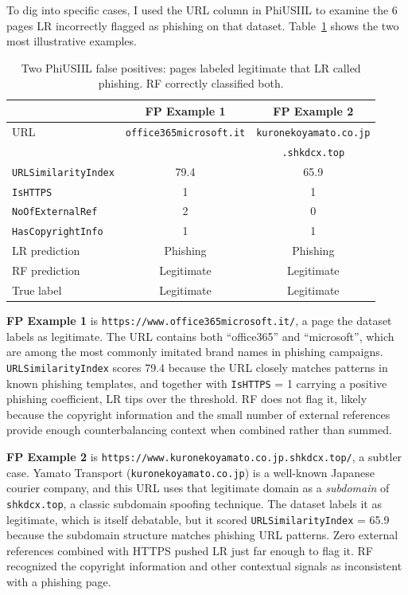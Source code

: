 \documentclass{article}
\begin{document}
To dig into specific cases, I used the URL column in PhiUSIIL to examine the 6 pages LR incorrectly flagged as phishing on that dataset.
Table~\ref{tab:fp_examples} shows the two most illustrative examples.

\begin{table}[ht]
\caption{Two PhiUSIIL false positives: pages labeled legitimate that LR called phishing. RF correctly classified both.}
\label{tab:fp_examples}
\centering
\small
\begin{tabular}{lcc}
\toprule
 & FP Example 1 & FP Example 2 \\
\midrule
URL & \texttt{office365microsoft.it} & \texttt{kuronekoyamato.co.jp} \\
    & & \texttt{.shkdcx.top} \\
\texttt{URLSimilarityIndex}    & 79.4 & 65.9 \\
\texttt{IsHTTPS}               & 1    & 1    \\
\texttt{NoOfExternalRef}       & 2    & 0    \\
\texttt{HasCopyrightInfo}      & 1    & 1    \\
\midrule
LR prediction  & Phishing   & Phishing   \\
RF prediction  & Legitimate & Legitimate \\
True label     & Legitimate & Legitimate \\
\bottomrule
\end{tabular}
\end{table}

\textbf{FP Example 1} is \texttt{https://www.office365microsoft.it/}, a page the dataset labels as legitimate.
The URL contains both ``office365'' and ``microsoft'', which are among the most commonly imitated brand names in phishing campaigns.
\texttt{URLSimilarityIndex} scores 79.4 because the URL closely matches patterns in known phishing templates, and together with \texttt{IsHTTPS} = 1 carrying a positive phishing coefficient, LR tips over the threshold.
RF does not flag it, likely because the copyright information and the small number of external references provide enough counterbalancing context when combined rather than summed.

\textbf{FP Example 2} is \texttt{https://www.kuronekoyamato.co.jp.shkdcx.top/}, a subtler case.
Yamato Transport (\texttt{kuronekoyamato.co.jp}) is a well-known Japanese courier company, and this URL uses that legitimate domain as a \textit{subdomain} of \texttt{shkdcx.top}, a classic subdomain spoofing technique.
The dataset labels it as legitimate, which is itself debatable, but it scored \texttt{URLSimilarityIndex} = 65.9 because the subdomain structure matches phishing URL patterns.
Zero external references combined with HTTPS pushed LR just far enough to flag it.
RF recognized the copyright information and other contextual signals as inconsistent with a phishing page.
\end{document}
